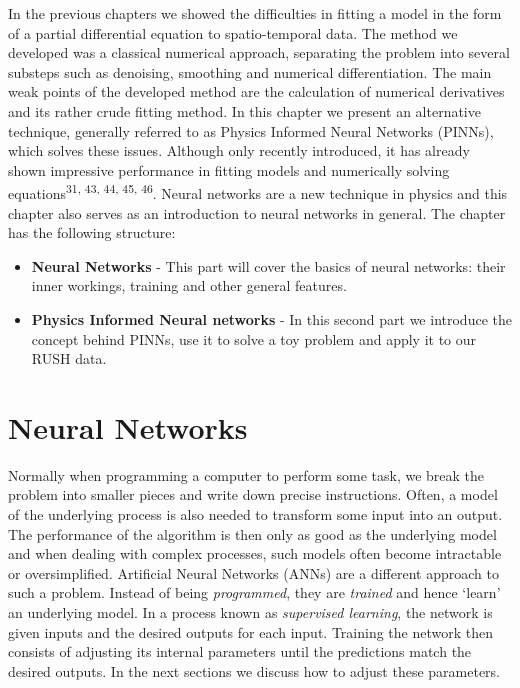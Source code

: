 \documentclass{Dissertate}
\providecommand{\tightlist}{%
  \setlength{\itemsep}{0pt}\setlength{\parskip}{0pt}}
\begin{document}
In the previous chapters we showed the difficulties in fitting a model
in the form of a partial differential equation to spatio-temporal data.
The method we developed was a classical numerical approach, separating
the problem into several substeps such as denoising, smoothing and
numerical differentiation. The main weak points of the developed method are the calculation of numerical derivatives and its rather crude fitting method. In this chapter we present an alternative
technique, generally referred to as Physics Informed Neural Networks
(PINNs), which solves these issues. Although only recently introduced, it has already shown impressive performance in fitting
models and numerically solving
equations\textsuperscript{31, 43, 44, 45, 46}.
Neural networks are a new technique in physics and this chapter also
serves as an introduction to neural networks in general. The chapter
has the following structure:

\begin{itemize}
\tightlist
\item
  \textbf{Neural Networks} - This part will cover the basics of neural
  networks: their inner workings, training and other general features.
\item
  \textbf{Physics Informed Neural networks} - In this second part we
  introduce the concept behind PINNs, use it to solve a toy problem and
  apply it to our RUSH data.
\end{itemize}

\hypertarget{neural-networks}{%
\section{Neural Networks}\label{neural-networks}}

Normally when programming a computer to perform some task, we break the
problem into smaller pieces and write down precise instructions.
Often, a model of the underlying process is also needed to transform
some input into an output. The performance of the algorithm is then only
as good as the underlying model and when dealing with complex processes,
such models often become intractable or oversimplified. Artificial
Neural Networks (ANNs) are a different approach to such a problem.
Instead of being \emph{programmed}, they are \emph{trained} and hence
`learn' an underlying model. In a process known as \emph{supervised
learning}, the network is given inputs and the desired outputs for each
input. Training the network then consists of adjusting its internal
parameters until the predictions match the desired outputs. In the next
sections we discuss how to adjust these parameters.
\end{document}
